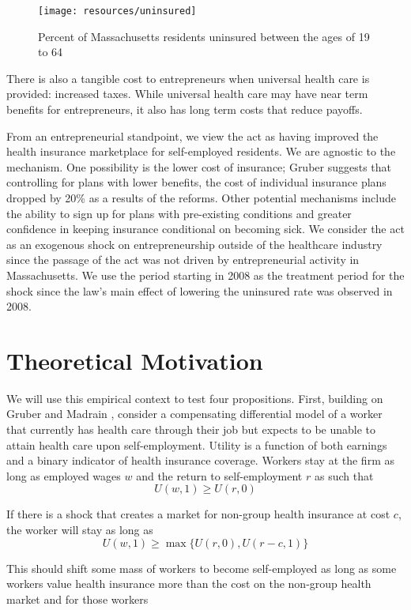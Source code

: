 \documentclass[12pt]{article}
\begin{document}
\begin{figure}[H]
	\centering
	\texttt{[image: resources/uninsured]}
	\caption{Percent of Massachusetts residents uninsured between the ages of 19 to 64}
\end{figure}

There is also a tangible cost to entrepreneurs when universal health care is provided: increased taxes.  While universal health care may have near term benefits for entrepreneurs, it also has long term costs that reduce payoffs. 

From an entrepreneurial standpoint, we view the act as having improved the health insurance marketplace for self-employed residents. We are agnostic to the mechanism. One possibility is the lower cost of insurance; Gruber \cite{gruber} suggests that controlling for plans with lower benefits, the cost of individual insurance plans dropped by 20\% as a results of the reforms. Other potential mechanisms include the ability to sign up for plans with pre-existing conditions and greater confidence in keeping insurance conditional on becoming sick. We consider the act as an exogenous shock on entrepreneurship outside of the healthcare industry since the passage of the act was not driven by entrepreneurial activity in Massachusetts. We use the period starting in 2008 as the treatment period for the shock since the law's main effect of lowering the uninsured rate was observed in 2008. 

\section{Theoretical Motivation}

We will use this empirical context to test four propositions. First, building on Gruber and Madrain \cite{gm2002}, consider a compensating differential model of a worker that currently has health care through their job but expects to be unable to attain health care upon self-employment. Utility is a function of both earnings and a binary indicator of health insurance coverage. Workers stay at the firm as long as employed wages $w$ and the return to self-employment $r$ as such that
$$U(w,1) \ge U(r,0)$$

If there is a shock that creates a market for non-group health insurance at cost $c$, the worker will stay as long as
$$U(w,1) \ge \max\{U(r,0),U(r-c,1)\}$$

This should shift some mass of workers to become self-employed as long as some workers value health insurance more than the cost on the non-group health market and for those workers
\end{document}
